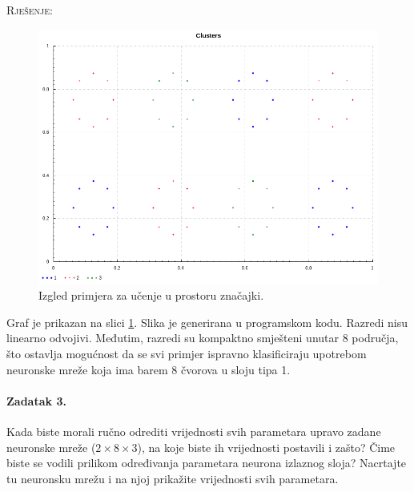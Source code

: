 \documentclass[12pt, a4paper]{article}
\begin{document}
\noindent\textsc{Rješenje:}
\begin{figure}[p]
  \centering
  \includegraphics[width=0.8\linewidth]{clusters.png}
  \caption{Izgled primjera za učenje u prostoru značajki.}
  \label{fig:clusters}
\end{figure}
Graf je prikazan na slici \ref{fig:clusters}.
Slika je generirana u programskom kodu.
Razredi nisu linearno odvojivi.
Međutim, razredi su kompaktno smješteni unutar 8 područja, što ostavlja mogućnost da se svi primjer ispravno klasificiraju upotrebom neuronske mreže koja ima barem 8 čvorova u sloju tipa 1.

\paragraph{Zadatak 3.}
Kada biste morali ručno odrediti vrijednosti svih parametara upravo zadane neuronske mreže ($2\times8\times3$), na koje biste ih vrijednosti postavili i zašto?
Čime biste se vodili prilikom određivanja parametara neurona izlaznog sloja?
Nacrtajte tu neuronsku mrežu i na njoj prikažite vrijednosti svih parametara.\\
\end{document}
